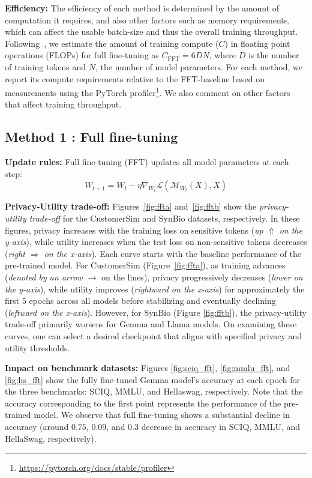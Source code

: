 \noindent
\textbf{Efficiency:}
The efficiency of each method is determined by the amount of computation it requires, and also other factors such as memory requirements, which can affect the usable batch-size and thus the overall training throughput.
Following~\cite{kaplan2020scaling}, we estimate the amount of training compute ($C$) in floating point operations (FLOPs) for full fine-tuning as $C_{\text{FFT}} = 6 D N$, where $D$ is the number of training tokens and $N$, the number of model parameters.
For each method, we report its compute requirements relative to the FFT-baseline based on measurements using the PyTorch profiler\footnote{\url{https://pytorch.org/docs/stable/profiler}}.
We also comment on other factors that affect training throughput.


\subsection{Method 1 : Full fine-tuning}

\textbf{Update rules:}
Full fine-tuning (FFT) updates all model parameters at each step:
\begin{equation}
    W_{t + 1} = W_t - \eta \nabla_{W_t} \mathcal{L}(\mathcal{M}_{W_{t}}(X), X)
\end{equation}



\noindent
\textbf{Privacy-Utility trade-off:}
Figures~\ref{fig:ffta} and~\ref{fig:fftb} show the \textit{privacy-utility trade-off} for the CustomerSim and SynBio datasets, respectively.
In these figures, privacy increases with the training loss on sensitive tokens (\textit{up $\Uparrow$ on the y-axis}), while utility increases when the test loss on non-sensitive tokens decreases (\textit{right $\Longrightarrow$ on the x-axis}).
Each curve starts with the baseline performance of the pre-trained model.
For CustomerSim (Figure~\ref{fig:ffta}), as training advances (\textit{denoted by an arrow $\rightarrow$} on the lines), privacy progressively decreases (\textit{lower on the y-axis}), while utility improves (\textit{rightward on the x-axis}) for approximately the first 5 epochs across all models before stabilizing and eventually declining (\textit{leftward on the x-axis}).
However, for SynBio (Figure \ref{fig:fftb}), the privacy-utility trade-off primarily worsens for Gemma and Llama models. On examining these curves, one can select a desired checkpoint that aligns with specified privacy and utility thresholds.

\noindent
\textbf{Impact on benchmark datasets:}
Figures \ref{fig:sciq_fft}, \ref{fig:mmlu_fft}, and \ref{fig:hs_fft} show the fully fine-tuned Gemma model's accuracy at each epoch for the three benchmarks: SCIQ, MMLU, and Hellaswag, respectively. Note that the accuracy corresponding to the first point represents the performance of the pre-trained model. We observe that full fine-tuning shows a substantial decline in accuracy (around $0.75$, $0.09$, and $0.3$ decrease in accuracy in SCIQ, MMLU, and HellaSwag,  respectively).

